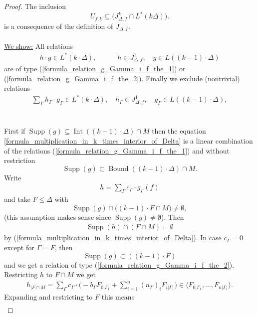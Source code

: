\documentclass[12pt, english]{article}
\DeclareMathOperator{\Int}{Int}
\DeclareMathOperator{\Supp}{Supp}
\DeclareMathOperator{\Bound}{Bound}
\begin{document}
\begin{proof}
	The inclusion
	\[ U_{f,k} \subseteq \Big( J_{\Delta,f}^k \cap L^{*}(k \Delta) \Big).   \]
	is a consequence of the definition of $J_{\Delta,f}$. \\ \\
	\underline{We show:} All relations
	\begin{align} \label{formula_multiplication_in_k_times_interior_of_Delta}
		h \cdot g \in L^*(k \cdot \Delta), \quad \quad \quad h \in J_{\Delta,f}^1, \quad g \in L((k-1) \cdot \Delta)
	\end{align}
	are of type (\ref{formula_relation_g_Gamma_i_f_the_1}) or (\ref{formula_relation_g_Gamma_i_f_the_2}). Finally we exclude (nontrivial) relations
	\begin{align*}
		\sum\limits_{\Gamma} h_{\Gamma} \cdot g_{\Gamma} \in L^*(k \cdot \Delta), \quad h_{\Gamma} \in J_{\Delta,f}^1, \quad g_{\Gamma} \in L((k-1) \cdot \Delta),
	\end{align*}
	\leavevmode \\ \\
	First if $\Supp(g) \subseteq \Int((k-1) \cdot \Delta) \cap M$ then the equation \ref{formula_multiplication_in_k_times_interior_of_Delta} is a linear combination of the relations (\ref{formula_relation_g_Gamma_i_f_the_1}) and without restriction
	\[ \Supp(g) \subset \Bound((k-1) \cdot \Delta) \cap M.  \]
	Write
	\begin{align*}
		h = \sum\limits_{\Gamma} c_{\Gamma} \cdot g_{\Gamma}(f)
	\end{align*}
	and take $F \leq \Delta$ with
	\[ \Supp(g) \cap \Big( (k-1) \cdot F \cap M \Big) \neq \emptyset,   \]
	(this assumption makes sense since $\Supp(g) \neq \emptyset$). Then
	\begin{align*}
		\Supp(h) \cap (F \cap M) = \emptyset
	\end{align*}
	by (\ref{formula_multiplication_in_k_times_interior_of_Delta}). In case $c_{\Gamma} = 0$ except for $\Gamma = F$, then
	\[ \Supp(g) \subset ((k-1) \cdot F)  \]
	and we get a relation of type (\ref{formula_relation_g_Gamma_i_f_the_2}). Restricting $h$ to $F \cap M$ we get
	\begin{align*}
		h_{\vert{F \cap M}} = \sum\limits_{\Gamma} c_{\Gamma} \cdot \big( -b_{\Gamma} F_{0 \vert{\Gamma_1}} + \sum\limits_{i=1}^n (n_{\Gamma})_i F_{i \vert{\Gamma_1}} \big) \in    \langle F_{0 \vert{\Gamma_1}},...,F_{n \vert{\Gamma_1}} \rangle. 
	\end{align*}
	Expanding and restricting to $F$ this means
	\begin{align} \label{formula_relation_between_the_g_Gamma}

\end{align}
\end{proof}
\end{document}
